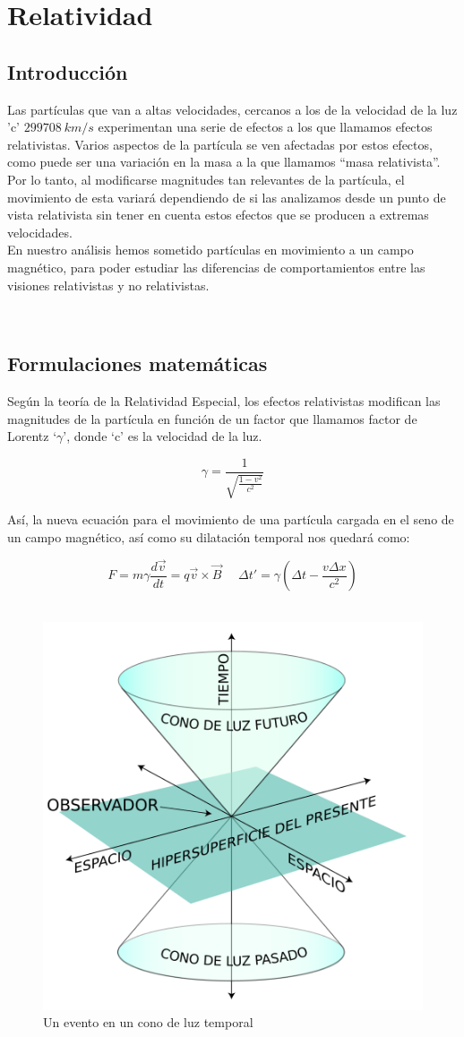 \documentclass{article}
\begin{document}
\section{Relatividad}
\hfill
\subsection{Introducción}
Las partículas que van a altas velocidades, cercanos a los de la
velocidad de la luz 'c' $299708\ \si{km/s}$ experimentan una serie de efectos a los que llamamos efectos relativistas. Varios aspectos de la partícula se ven afectadas por estos efectos, como puede ser una variación en la masa a la que llamamos “masa relativista”. \\

Por lo tanto, al modificarse magnitudes tan relevantes de la partícula, el movimiento de esta variará dependiendo de si las analizamos desde un punto de vista relativista sin tener en cuenta estos efectos que se producen a extremas velocidades.\\

En nuestro análisis hemos sometido partículas en movimiento a un campo magnético, para
poder estudiar las diferencias de comportamientos entre las visiones relativistas y no relativistas.

\hfill\\
\subsection{Formulaciones matemáticas}
Según la teoría de la Relatividad Especial, los efectos relativistas modifican las magnitudes de la partícula en función de un factor que llamamos factor de Lorentz ‘$\gamma$’, donde ‘c’ es la velocidad de la luz.

\[\boxed{\gamma = \frac{1}{\sqrt{\frac{1-v^2}{c^2}}}}\]
\hfill

Así, la nueva ecuación para el movimiento de una partícula cargada en el seno de un campo magnético, así como su dilatación temporal nos quedará como: 

\[\boxed{F = m\gamma \frac{d\Vec{v}}{dt} = q\Vec{v} \times \Vec{B}}\ \ \ \ \ \ \boxed{\Delta t' = \gamma\left( \Delta t-\frac{v\Delta x}{c^2}\right)}\]
\hfill\hfill\\

\begin{figure}[h]
\centering
\includegraphics[width=.4\textwidth]{Fotos/470px-World_line-es.svg.png}
\caption{Un evento en un cono de luz temporal}
\end{figure}
\end{document}
